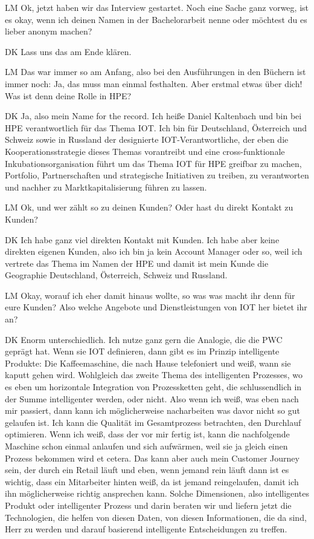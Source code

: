 \begin{xlist}
     \item[LM] Ok, jetzt haben wir das Interview gestartet. Noch eine Sache ganz vorweg, ist es okay, wenn ich deinen Namen in der Bachelorarbeit nenne oder möchtest du es lieber anonym machen?
     \item[DK] Lass uns das am Ende klären.
     \item[LM] Das war immer so am Anfang, also bei den Ausführungen in den Büchern ist immer noch: Ja, das muss man einmal festhalten. Aber erstmal etwas über dich! Was ist denn deine Rolle in HPE?
     \item[DK] Ja, also mein Name for the record. Ich heiße Daniel Kaltenbach und bin bei HPE verantwortlich für das Thema IOT. Ich bin für Deutschland, Österreich und Schweiz sowie in Russland der designierte IOT-Verantwortliche, der eben die Kooperationsstrategie dieses Themas vorantreibt und eine cross-funktionale Inkubationsorganisation führt um das Thema IOT für HPE greifbar zu machen, Portfolio, Partnerschaften und strategische Initiativen zu treiben, zu verantworten und nachher zu Marktkapitalisierung führen zu lassen.
     \item[LM] Ok, und wer zählt so zu deinen Kunden? Oder hast du direkt Kontakt zu Kunden?
     \item[DK] Ich habe ganz viel direkten Kontakt mit Kunden. Ich habe aber keine direkten eigenen Kunden, also ich bin ja kein Account Manager oder so, weil ich vertrete das Thema im Namen der HPE und damit ist mein Kunde die Geographie Deutschland, Österreich, Schweiz und Russland.
     \item[LM] Okay, worauf ich eher damit hinaus wollte, so was was macht ihr denn für eure Kunden? Also welche Angebote und Dienstleistungen von IOT her bietet ihr an?
     \item[DK] Enorm unterschiedlich. Ich nutze ganz gern die Analogie, die die PWC geprägt hat. Wenn sie IOT definieren, dann gibt es im Prinzip intelligente Produkte: Die Kaffeemaschine, die nach Hause telefoniert und weiß, wann sie kaputt gehen wird. Wohlgleich das zweite Thema des intelligenten Prozesses, wo es eben um horizontale Integration von Prozessketten geht, die schlussendlich in der Summe intelligenter werden, oder nicht. Also wenn ich weiß, was eben nach mir passiert, dann kann ich möglicherweise nacharbeiten was davor nicht so gut gelaufen ist. Ich kann die Qualität im Gesamtprozess betrachten, den Durchlauf optimieren. Wenn ich weiß, dass der vor mir fertig ist, kann die nachfolgende Maschine schon einmal anlaufen und sich aufwärmen, weil sie ja gleich einen Prozess bekommen wird et cetera. Das kann aber auch mein Customer Journey sein, der durch ein Retail läuft und eben, wenn jemand rein läuft dann ist es wichtig, dass ein Mitarbeiter hinten weiß, da ist jemand reingelaufen, damit ich ihn möglicherweise richtig ansprechen kann. Solche Dimensionen, also intelligentes Produkt oder intelligenter Prozess und darin beraten wir und liefern jetzt die Technologien, die helfen von diesen Daten, von diesen Informationen, die da sind, Herr zu werden und darauf basierend intelligente Entscheidungen zu treffen.

\end{xlist}

